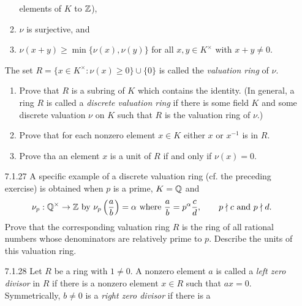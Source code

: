 \begin{enumerate}
\begin{enumerate}
                           elements of $K$ to $\mathbb{Z}$),
                     \item $\nu$ is surjective, and
                     \item $\nu(x + y) \ge \min\{\nu(x), \nu(y)\}$ for all
                           $x, y \in K^\times$ with $x + y \neq 0$.
                  \end{enumerate}
                  The set $R = \{x \in K^\times : \nu(x) \ge 0\} \cup \{0\}$ is
                  called the \textit{valuation ring} of $\nu$.
                  \begin{enumerate}
                     \item Prove that $R$ is a subring of $K$ which contains the
                           identity. (In general, a ring $R$ is called a
                           \textit{discrete valuation ring} if there is some
                           field $K$ and some discrete valuation $\nu$ on $K$
                           such that $R$ is the valuation ring of $\nu$.)
                     \item Prove that for each nonzero element $x \in K$ either
                           $x$ or $x^{-1}$ is in $R$.
                     \item Prove tha an element $x$ is a unit of $R$ if and only
                           if $\nu(x) = 0$.
                  \end{enumerate}
   \item[7.1.27]  A specific example of a discrete valuation ring (cf. the
                  preceding exercise) is obtained when $p$ is a prime, $K = \mathbb{Q}$
                  and
                  $$\nu_p : \mathbb{Q}^\times \rightarrow \mathbb{Z} \text{ by }
                    \nu_p\left(\frac{a}{b}\right) = \alpha \text{ where }
                    \frac{a}{b} = p^\alpha\frac{c}{d}, \qquad p \nmid c
                    \text{ and } p \nmid d.$$
                  Prove that the corresponding valuation ring $R$ is the ring of
                  all rational numbers whose denominators are relatively prime
                  to $p$. Describe the units of this valuation ring.
   \item[7.1.28]  Let $R$ be a ring with $1 \neq 0$. A nonzero element $a$ is
                  called a \textit{left zero divisor} in $R$ if there is a
                  nonzero element $x \in R$ such that $ax = 0$. Symmetrically,
                  $b \neq 0$ is a \textit{right zero divisor} if there is a

\end{enumerate}

